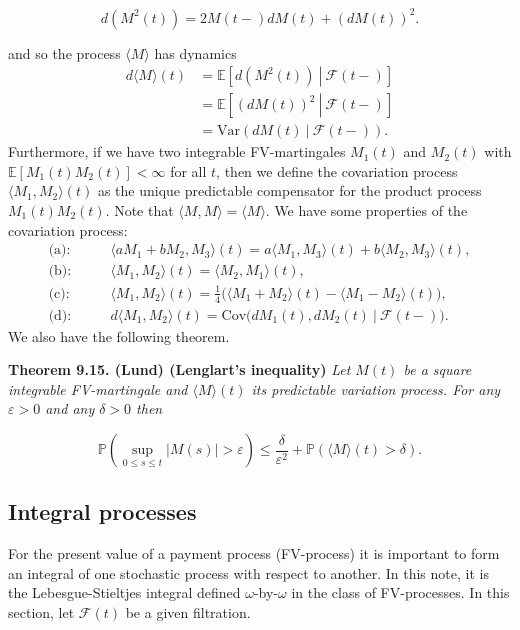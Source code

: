 \documentclass[a4paper,10pt,openany]{book}
\begin{document}
\[
d\left(M^2(t)\right)=2M(t-)dM(t)+\left(dM(t)\right)^2.
\]

and so the process \(\langle M\rangle\) has dynamics
\begin{align*}
d\langle M\rangle (t)&=\mathbb E\left[\left.d\left(M^2(t)\right)\ \right\vert\ \mathcal F(t-)\right]\\
&=\mathbb E\left[\left.\left(dM(t)\right)^2\ \right\vert\ \mathcal F(t-)\right]\\
&=\text{Var}(dM(t)\ \vert\ \mathcal F(t-)).
\end{align*}
Furthermore, if we have two integrable FV-martingales \(M_1(t)\) and \(M_2(t)\) with \(\mathbb E[M_1(t)M_2(t)]<\infty\) for all \(t\), then we define the covariation process \(\langle M_1,M_2\rangle(t)\) as the unique predictable compensator for the product process \(M_1(t)M_2(t)\). Note that \(\langle M,M\rangle =\langle M\rangle\). We have some properties of the covariation process:
\begin{align*}
\text{(a)}:&\qquad\langle aM_1+bM_2,M_3\rangle(t)=a\langle M_1,M_3\rangle(t)+b\langle M_2,M_3\rangle (t),\\
\text{(b)}:&\qquad\langle M_1,M_2\rangle(t)=\langle M_2,M_1\rangle(t),\\
\text{(c)}:&\qquad\langle M_1,M_2\rangle(t)=\frac{1}{4}\Big(\langle M_1+M_2\rangle(t)-\langle M_1-M_2\rangle (t)\Big),\\
\text{(d)}:&\qquad d\langle M_1,M_2\rangle(t)=\text{Cov}\Big(dM_1(t),dM_2(t)\ \vert\ \mathcal F(t-)\Big).
\end{align*}
We also have the following theorem.

\textbf{Theorem 9.15. (Lund) (Lenglart's inequality)} \emph{Let \(M(t)\) be a square integrable FV-martingale and
\(\langle M\rangle(t)\) its predictable variation process. For any \(\varepsilon > 0\) and any \(\delta > 0\) then}

\[
\mathbb P \left(\sup_{0\le s\le t}\vert M(s)\vert > \varepsilon\right)\le \frac{\delta}{\varepsilon^2}+\mathbb P(\langle M\rangle (t)> \delta).
\]

\hypertarget{integral-processes}{%
\subsection{Integral processes}\label{integral-processes}}

For the present value of a payment process (FV-process) it is important to form an integral of one stochastic process with respect to another. In this note, it is the Lebesgue-Stieltjes integral defined \(\omega\)-by-\(\omega\) in the class of FV-processes. In this section, let \(\mathcal F(t)\) be a given filtration.
\end{document}
